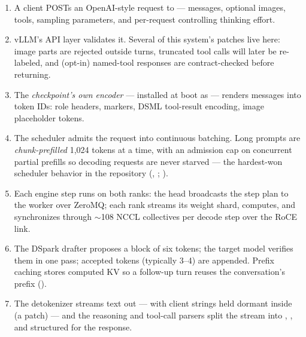 \begin{enumerate}
  \item A client POSTs an OpenAI-style request to
     --- messages, optional
    images, tools, sampling parameters, and per-request
     controlling thinking effort.
  \item vLLM's API layer validates it. Several of this system's patches
    live here: image parts are rejected outside  turns, truncated
    tool calls will later be re-labeled, and (opt-in) named-tool responses
    are contract-checked before returning.
  \item The \emph{checkpoint's own encoder} --- installed at boot as
     --- renders messages
    into token IDs: role headers,  markers, DSML tool-result
    encoding, image placeholder tokens.
  \item The scheduler admits the request into continuous batching. Long
    prompts are \emph{chunk-prefilled} 1{,}024 tokens at a time, with an
    admission cap on concurrent partial prefills so decoding requests are
    never starved --- the hardest-won scheduler behavior in the repository
    (, ; ).
  \item Each engine step runs on both ranks: the head broadcasts the step
    plan to the worker over ZeroMQ; each rank streams its weight shard,
    computes, and synchronizes through $\sim$108 NCCL collectives per decode
    step over the RoCE link.
  \item The DSpark drafter proposes a block of six tokens; the target model
    verifies them in one pass; accepted tokens (typically 3--4) are appended.
    Prefix caching stores computed KV so a follow-up turn reuses the
    conversation's prefix ().
  \item The detokenizer streams text out --- with client  strings
    held dormant inside  (a patch) --- and the reasoning and
    tool-call parsers split the stream into , ,
    and structured  for the response.
\end{enumerate}


